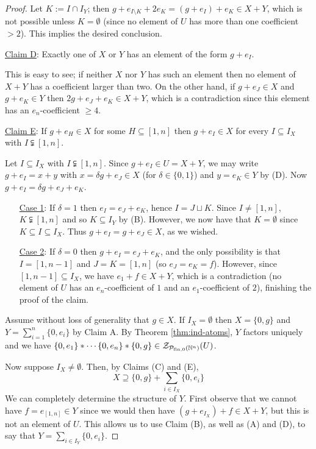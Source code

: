 \begin{proof}
Let $K := I\cap I_Y$; then $g + e_{I\setminus K} + 2e_K = (g+e_I) + e_K \in X+Y$, which is not possible unless $K=\emptyset$ (since no element of $U$ has more than one coefficient $>2$).
This implies the desired conclusion.

\noindent\underline{Claim D}: Exactly one of $X$ or $Y$ has an element of the form $g + e_I$. 

This is easy to see; if neither $X$ nor $Y$ has such an element then no element of $X+Y$ has a coefficient larger than two.
On the other hand, if $g+e_J\in X$ and $g+e_K\in Y$ then $2g + e_J + e_K \in X+Y$, which is a contradiction since this element has an $e_n$-coefficient $\ge 4$.

\noindent\underline{Claim E}: If $g+ e_H\in X$ for some $H\subseteq [ 1,n ]$ then $g + e_I \in X$ for every $I\subseteq I_X$ with $I\subsetneqq [ 1,n]$. 

Let $I \subseteq I_X$ with $I\subsetneqq [1,n]$.
Since $g+e_I\in U = X+Y$, we may write $g+e_I = x +y$ with $x = \delta g + e_J\in X$ (for $\delta\in \{0,1\}$) and $y=e_K\in Y$ by (D).
Now $g + e_I = \delta g + e_J + e_K$.
\begin{itemize}
\item[\underline{Case 1}:] If $\delta = 1$ then $e_I = e_J + e_K$, hence $I = J\sqcup K$. 
Since $I\neq [1,n]$, $K\subsetneqq [ 1,n ]$ and so $K\subseteq I_Y$ by (B).
However, we now have that $K = \emptyset$ since $K\subseteq I \subseteq I_X$.
Thus $g + e_I = g + e_J \in X$, as we wished.
\item[\underline{Case 2}:] If $\delta = 0$ then $g + e_I = e_J + e_K$, and the only possibility is that $I = [ 1,n-1]$ and $J = K = [ 1,n]$ (so $e_J = e_K = f$).
However, since $[ 1,n-1 ] \subseteq I_X$, we have $e_1 + f \in X+Y$, which is a contradiction (no element of $U$ has an $e_n$-coefficient of $1$ and an $e_1$-coefficient of $2$), finishing the proof of the claim.
\end{itemize}

Assume without loss of generality that $g\in X$.
If $I_X = \emptyset$ then $X = \{0,g\}$ and $Y = \sum_{i=1}^n \{0,e_i\}$ by Claim A.
By Theorem \ref{thm:ind-atoms}, $Y$ factors uniquely and we have $\{0,e_1\}*\cdots \{0,e_n\}*\{0,g\}\in \mathcal{Z}_{\mathcal{P}_{\textrm{fin}, 0}(\mathbb{N}^n)}(U)$.

Now suppose $I_X \neq \emptyset$.
Then, by Claims (C) and (E), 
\[X \supseteq \{0,g\} + \sum_{i\in I_X} \{0,e_i\} \tag{1} \label{factor-includes} \]
We can completely determine the structure of $Y$.
First observe that we cannot have $f=e_{[1,n]}\in Y$ since we would then have $(g+e_{I_X})+f \in X+Y$, but this is not an element of $U$.
This allows us to use Claim (B), as well as (A) and (D), to say that $Y = \sum_{i\in I_Y} \{0,e_i\}$.


\end{proof}
